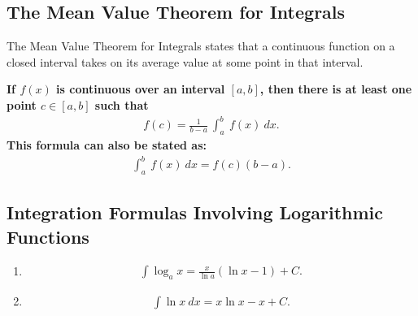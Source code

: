 \documentclass{report}
\begin{document}
    \subsection{The Mean Value Theorem for Integrals}
    \bigbreak \noindent 
    The Mean Value Theorem for Integrals states that a continuous function on a closed interval takes on its average value at some point in that interval.
    \smallbreak \noindent
    \begin{definition} 
        \textbf{If $f(x)$ is continuous over an interval $[a,b]$, then there is at least one point  $c \in [a,b] $ such that
            \begin{align*}
                f(c) = \frac{1}{b-a}\ \int_{a}^{b}\ f(x)\ dx
            .\end{align*}
        This formula can also be stated as:
        \begin{align*}
            \int_{a}^{b}\ f(x)\ dx = f(c)(b-a)
        .\end{align*}
        } 

    \end{definition}
    \bigbreak \noindent \bigbreak \noindent 
    \subsection{Integration Formulas Involving Logarithmic Functions}
    \bigbreak \noindent 
    \begin{enumerate}
        \item         
    \begin{align*}
        \int \log_{a}{x} = \frac{x}{\ln{a}}(\ln{x}-1) + C
    .\end{align*}
    \item 
        \begin{align*}
            \int \ln{x}\ dx = x\ln{x} -x + C
        .\end{align*}
    \end{enumerate}






    
    
\end{document}
